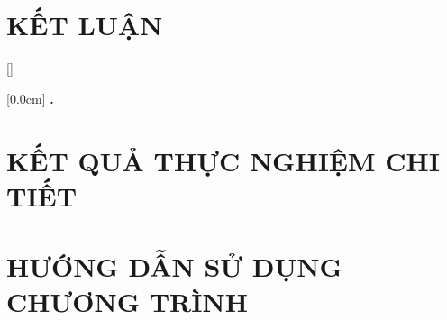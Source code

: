 \documentclass[a4paper,13pt,3p,twoside]{report}
\renewcommand{\bibname}{Danh_sach_tai_lieu_tham_khao}
\theoremstyle{definition}
\begin{document}
\newpage
\chapter{KẾT LUẬN}


% 

\newpage
\renewcommand\bibname{TÀI LIỆU THAM KHẢO}
\printbibliography
{}

\appendixpage
\appendix
\addappheadtotoc

[]
\titlespacing*{\chapter}{0pt}{-20pt}{20pt}

    [0.0cm]             %
    {\bfseries\vspace{0.3cm}}                  %
    {{\bfseries{\scshape} \thecontentslabel.\ }} %
    {}         %
    {\contentspage} 
    
\chapter{KẾT QUẢ THỰC NGHIỆM CHI TIẾT}


\newpage
\chapter{HƯỚNG DẪN SỬ DỤNG CHƯƠNG TRÌNH}

\end{document}
